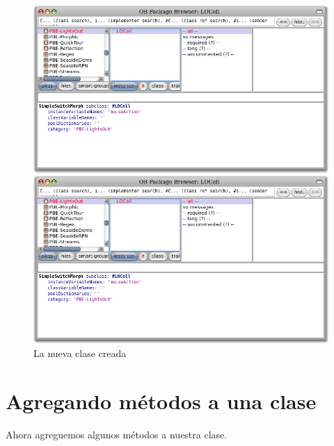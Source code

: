 \documentclass[a4paper,10pt,twoside]{book}
\begin{document}
\begin{figure}[h!t]
\ifluluelse
	{\centerline {\includegraphics[width=\textwidth]{LOCell}}}
	{\centerline {\includegraphics[scale=0.7]{LOCell}}}
\caption{La nueva clase creada }
\end{figure}


\section{Agregando m\'etodos a una clase}

Ahora agreguemos algunos m\'etodos a nuestra clase.

\end{document}
